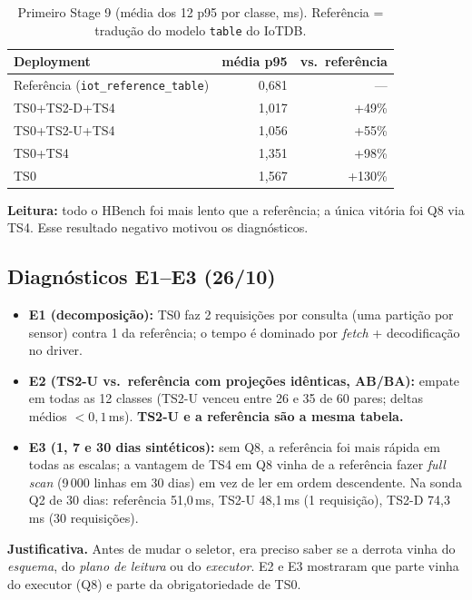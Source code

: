 \documentclass[11pt,a4paper]{article}
\newcommand{\caixa}[2][boxbg]{\par\smallskip\noindent\colorbox{#1}{\parbox{\dimexpr\linewidth-2\fboxsep}{#2}}\par\smallskip}
\newcommand{\just}[1]{\caixa{\textbf{Justificativa.} #1}}
\begin{document}
\begin{table}[H]\centering\small
\caption{Primeiro Stage 9 (média dos 12 p95 por classe, ms). Referência = tradução do modelo \texttt{table} do IoTDB.}
\begin{tabular}{@{}lrr@{}}\toprule
Deployment & média p95 & vs.\ referência\\\midrule
Referência (\texttt{iot\_reference\_table}) & 0,681 & ---\\
TS0+TS2-D+TS4 & 1,017 & +49\%\\
TS0+TS2-U+TS4 & 1,056 & +55\%\\
TS0+TS4 & 1,351 & +98\%\\
TS0 & 1,567 & +130\%\\\bottomrule
\end{tabular}\end{table}

\textbf{Leitura:} todo o HBench foi mais lento que a referência; a única vitória foi Q8 via TS4. Esse resultado negativo motivou os diagnósticos.

\subsection{Diagnósticos E1--E3 (26/10)}
\begin{itemize}
\item \textbf{E1 (decomposição):} TS0 faz 2 requisições por consulta (uma partição por sensor) contra 1 da referência; o tempo é dominado por \emph{fetch} + decodificação no driver.
\item \textbf{E2 (TS2-U vs.\ referência com projeções idênticas, AB/BA):} empate em todas as 12 classes (TS2-U venceu entre 26 e 35 de 60 pares; deltas médios $<0{,}1$\,ms). \textbf{TS2-U e a referência são a mesma tabela.}
\item \textbf{E3 (1, 7 e 30 dias sintéticos):} sem Q8, a referência foi mais rápida em todas as escalas; a vantagem de TS4 em Q8 vinha de a referência fazer \emph{full scan} (9\,000 linhas em 30 dias) em vez de ler em ordem descendente. Na sonda Q2 de 30 dias: referência 51,0\,ms, TS2-U 48,1\,ms (1 requisição), TS2-D 74,3\,ms (30 requisições).
\end{itemize}

\just{Antes de mudar o seletor, era preciso saber se a derrota vinha do \emph{esquema}, do \emph{plano de leitura} ou do \emph{executor}. E2 e E3 mostraram que parte vinha do executor (Q8) e parte da obrigatoriedade de TS0.}
\end{document}

